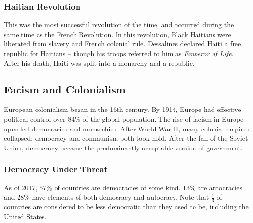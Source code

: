 \documentclass[letterpaper]{article}
\begin{document}
\subsubsection{Haitian Revolution}
This was the most successful revolution of the time, and occurred during the same time as the French Revolution. In this revolution, Black Haitians were liberated from slavery and French colonial rule. Dessalines declared Haiti a free republic for Haitians -- though his troops referred to him as \emph{Emperor of Life}. After his death, Haiti was split into a monarchy and a republic.

\subsection{Facism and Colonialism}
European colonialism began in the 16th century. By 1914, Europe had effective political control over 84\% of the global population. The rise of facism in Europe upended democracies and monarchies. After World War II, many colonial empires collapsed; democracy and communism both took hold. After the fall of the Soviet Union, democracy became the predominantly acceptable version of government. 

\subsubsection{Democracy Under Threat}
As of 2017, 57\% of countries are democracies of some kind. 13\% are autocracies and 28\% have elements of both democracy and autocracy. Note that $\frac{1}{3}$ of countries are considered to be less democratic than they used to be, including the United States.
\end{document}
